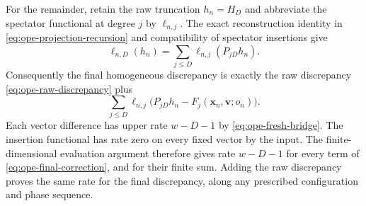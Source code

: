 For the remainder, retain the raw truncation $h_n=H_D$ and abbreviate
the spectator functional at degree $j$ by $\ell_{n,j}$. The exact
reconstruction identity in \eqref{eq:ope-projection-recursion} and
compatibility of spectator insertions give
\[
 \ell_{n,D}(h_n)=\sum_{j\leq D}\ell_{n,j}(P_{jD}h_n).
\]
Consequently the final homogeneous discrepancy is exactly the raw
discrepancy \eqref{eq:ope-raw-discrepancy} plus
\begin{equation}\label{eq:ope-final-correction}
 \sum_{j\leq D}\ell_{n,j}
       \bigl(P_{jD}h_n-F_j(\boldsymbol x_n,\boldsymbol v;o_n)\bigr).
\end{equation}
Each vector difference has upper rate $w-D-1$ by
\eqref{eq:ope-fresh-bridge}. The insertion functional has rate zero on
every fixed vector by the input. The finite-dimensional evaluation
argument therefore gives rate $w-D-1$ for every term of
\eqref{eq:ope-final-correction}, and for their finite sum. Adding the
raw discrepancy proves the same rate for the final discrepancy, along
any prescribed configuration and phase sequence.

